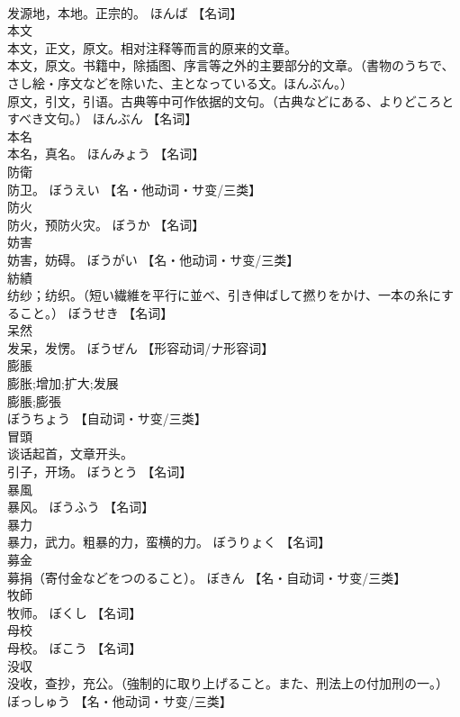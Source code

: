 \documentclass[8pt]{extreport}
\begin{document}
\begin{CJK}{UTF8}{min}
\\	发源地，本地。正宗的。	ほんば		【名词】
\\	本文	
\\	本文，正文，原文。相对注释等而言的原来的文章。 
\\	本文，原文。书籍中，除插图、序言等之外的主要部分的文章。（書物のうちで、さし絵・序文などを除いた、主となっている文。ほんぶん。） 
\\	原文，引文，引语。古典等中可作依据的文句。（古典などにある、よりどころとすべき文句。）	ほんぶん		【名词】
\\	本名	
\\	本名，真名。	ほんみょう		【名词】
\\	防衛	
\\	防卫。	ぼうえい		【名・他动词・サ变/三类】
\\	防火	
\\	防火，预防火灾。	ぼうか		【名词】
\\	妨害	
\\	妨害，妨碍。	ぼうがい		【名・他动词・サ变/三类】
\\	紡績	
\\	纺纱；纺织。（短い繊維を平行に並べ、引き伸ばして撚りをかけ、一本の糸にすること。）	ぼうせき		【名词】
\\	呆然	
\\	发呆，发愣。	ぼうぜん		【形容动词/ナ形容词】
\\	膨脹	
\\	膨胀;增加;扩大;发展 
\\	膨脹;膨張 
\\	ぼうちょう		【自动词・サ变/三类】
\\	冒頭	
\\	谈话起首，文章开头。 
\\	引子，开场。	ぼうとう		【名词】
\\	暴風	
\\	暴风。	ぼうふう		【名词】
\\	暴力	
\\	暴力，武力。粗暴的力，蛮横的力。	ぼうりょく		【名词】
\\	募金	
\\	募捐（寄付金などをつのること）。	ぼきん		【名・自动词・サ变/三类】
\\	牧師	
\\	牧师。	ぼくし		【名词】
\\	母校	
\\	母校。	ぼこう		【名词】
\\	没収	
\\	没收，查抄，充公。（強制的に取り上げること。また、刑法上の付加刑の一。）	ぼっしゅう		【名・他动词・サ变/三类】

\end{CJK}
\end{document}
